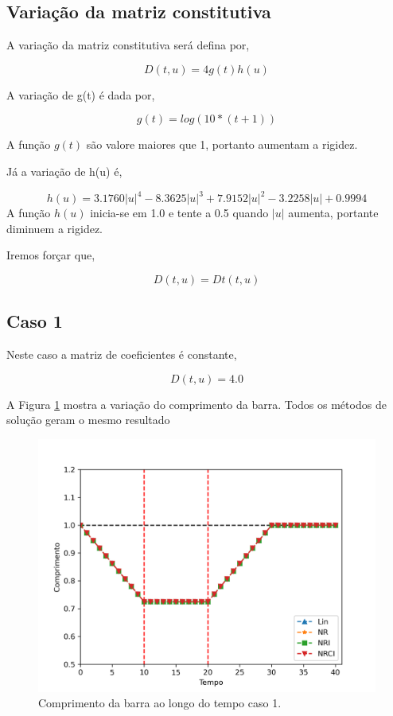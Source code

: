\documentclass[12pt,a4paper]{article}
\begin{document}
\subsection{Variação da matriz constitutiva}

A variação da matriz constitutiva será defina por,

\begin{equation}
D(t,u) = 4g(t)h(u)
\end{equation}

A variação de g(t) é dada por,

\begin{equation}
g(t) = log(10*(t+1))
\end{equation}

\noindent
A função $g(t)$ são valore maiores que 1, portanto aumentam a rigidez. 


\noindent
Já a variação de h(u) é,

\begin{equation}
h(u) = 3.1760|u|^4 - 8.3625|u|^3 + 7.9152|u|^2 - 3.2258|u| + 0.9994
\end{equation}
\noindent
A função $h(u)$ inicia-se em 1.0 e tente a 0.5 quando $|u|$ aumenta, portante diminuem a rigidez. 


Iremos forçar que, 

\begin{equation}
D(t, u) = Dt(t, u)
\end{equation}

\subsection{Caso 1}

Neste caso a matriz de coeficientes é constante,

\begin{equation}
D(t,u) = 4.0
\end{equation}

A Figura \ref{fig:u_caso1} mostra a variação do comprimento da barra. Todos os métodos de solução geram o mesmo resultado

\begin{figure}[H]
	\centering
	\includegraphics[width=1.0\textwidth]{caso1/desloc_caso1.png}
	\caption{Comprimento da barra ao longo do tempo caso 1.}
	\label{fig:u_caso1}
\end{figure}
\end{document}
